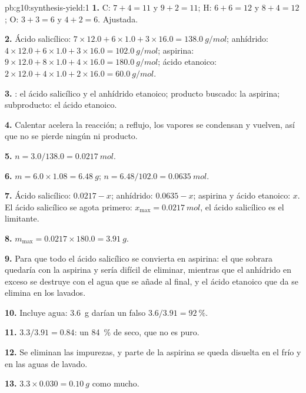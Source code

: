 \begin{solution}{pb:g10:synthesis-yield:1}
\textbf{1.} C: $7 + 4 = 11$ y $9 + 2 = 11$; H: $6 + 6 = 12$ y
$8 + 4 = 12$; O: $3 + 3 = 6$ y $4 + 2 = 6$. Ajustada.

\textbf{2.} Ácido salicílico: $7 \times 12.0 + 6 \times 1.0 + 3 \times 16.0
= \qty{138.0}{g/mol}$; anhídrido: $4 \times 12.0 + 6 \times 1.0 +
3 \times 16.0 = \qty{102.0}{g/mol}$; aspirina: $9 \times 12.0 + 8 \times
1.0 + 4 \times 16.0 = \qty{180.0}{g/mol}$; ácido etanoico: $2 \times 12.0
+ 4 \times 1.0 + 2 \times 16.0 = \qty{60.0}{g/mol}$.

\textbf{3.} : el ácido salicílico y el anhídrido etanoico;
producto buscado: la aspirina; subproducto: el ácido etanoico.

\textbf{4.} Calentar acelera la reacción; a reflujo, los vapores se
condensan y vuelven, así que no se pierde ningún  ni producto.

\textbf{5.} $n = 3.0 / 138.0 = \qty{0.0217}{mol}$.

\textbf{6.} $m = 6.0 \times 1.08 = \qty{6.48}{g}$;
$n = 6.48 / 102.0 = \qty{0.0635}{mol}$.

\textbf{7.} Ácido salicílico: $0.0217 - x$; anhídrido: $0.0635 - x$;
aspirina y ácido etanoico: $x$. El ácido salicílico se agota primero:
$x_{\max} = \qty{0.0217}{mol}$, el ácido salicílico es el limitante.

\textbf{8.} $m_{\max} = 0.0217 \times 180.0 = \qty{3.91}{g}$.

\textbf{9.} Para que todo el ácido salicílico se convierta en aspirina:
el que sobrara quedaría  con la aspirina y sería difícil de
eliminar, mientras que el anhídrido en exceso se destruye con el agua
que se añade al final, y el ácido etanoico que da se elimina en los
lavados.

\textbf{10.} Incluye agua: \qty{3.6}{g} darían un falso
$3.6 / 3.91 = \qty{92}{\percent}$.

\textbf{11.} $3.3 / 3.91 = 0.84$: un \qty{84}{\percent} de  seco, que no es puro.

\textbf{12.} Se eliminan las impurezas, y parte de la aspirina se queda
disuelta en el  frío y en las aguas de lavado.

\textbf{13.} $3.3 \times 0.030 = \qty{0.10}{g}$ como mucho.


\end{solution}
